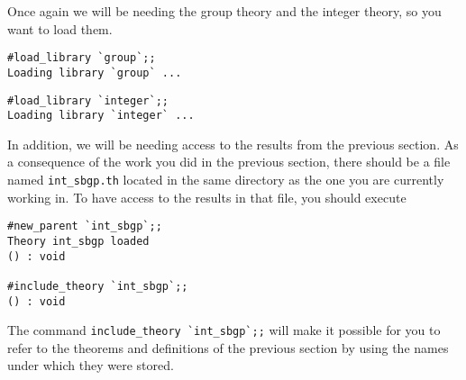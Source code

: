 Once again we will be needing the group theory and the integer theory,
so you want to load them.
\begin{session}
\begin{verbatim}
#load_library `group`;;
Loading library `group` ...
\end{verbatim}
\mvdots
\begin{verbatim}
#load_library `integer`;;
Loading library `integer` ...
\end{verbatim}
\end{session}

In addition, we will be needing access to the results from the
previous section.  As a consequence of the work you did in the
previous section, there should be a file named
{\small\verb+int_sbgp.th+} located in the same directory as the one
you are currently working in.  To have access to the results in that
file, you should execute 
\begin{session}
\begin{verbatim}
#new_parent `int_sbgp`;;
Theory int_sbgp loaded
() : void

#include_theory `int_sbgp`;;
() : void
\end{verbatim}
\end{session}

The command {\small\verb+include_theory `int_sbgp`;;+} will make it
possible for you to refer to the theorems and definitions of the
previous section by using the names under which they were stored.

